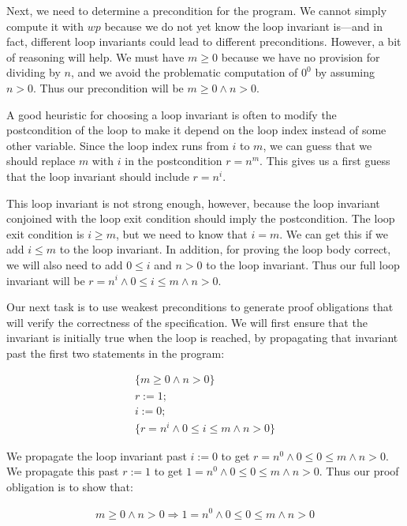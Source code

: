 \documentclass[11pt]{article}
\begin{document}
Next, we need to determine a precondition for the program.  We cannot simply
compute it with $wp$ because we do not yet know the loop
invariant is---and in fact, different loop invariants could lead to
different preconditions.  However, a bit of reasoning will help.  We
must have $m \ge 0$ because we have no provision for dividing by $n$,
and we avoid the problematic computation of $0^0$ by assuming $n>0$.
Thus our precondition will be $m \ge 0 \land n > 0$.

A good heuristic for choosing a
loop invariant is often to modify the postcondition of the loop to
make it depend on the loop index instead of some other variable.
Since the loop index runs from $i$ to $m$, we can guess that we should
replace $m$ with $i$ in the postcondition $r=n^m$.  This gives us a
first guess that the loop invariant should include $r=n^i$.

This loop invariant is not strong enough, however, because the loop invariant conjoined with the
loop exit condition should imply the postcondition.  The loop exit
condition is $i \ge m$, but we need to know that $i = m$.  We can get
this if we add $i \le m$ to the loop invariant.  In addition, for
proving the loop body correct, we will also need to add $0 \le i$ and
$n > 0$ to the loop invariant.  Thus our full loop invariant
will be $r=n^i \land 0 \le i \le m \land n > 0$.

Our next task is to use weakest preconditions to generate proof
obligations that will verify the correctness of the specification.
We will first ensure that the invariant is initially true when
the loop is reached, by propagating that invariant past the first
two statements in the program:

\[
\begin{array}{l}
\{m \ge 0 \land n > 0\}\\
r := 1;\\
i := 0;\\
\{ r=n^i \land 0 \le i \le m \land n > 0 \}
\end{array}
\]

We propagate the loop invariant past $i :=0$ to get
$r=n^0 \land 0 \le 0 \le m \land n > 0$.  We propagate this
past $r :=1$ to get $1=n^0 \land 0 \le 0 \le m \land n > 0$.
Thus our proof obligation is to show that:

\[
\begin{array}{l}
m \ge 0 \land n > 0
\Rightarrow 1=n^0 \land 0 \le 0 \le m \land n > 0
\end{array}
\]
\end{document}
